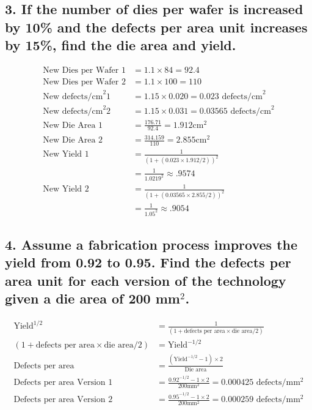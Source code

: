 \documentclass[11pt]{article}
\begin{document}
\subsection*{\small 3. If the number of dies per wafer is increased by 10\% and the defects per area unit increases by 15\%, find the die area and yield.}
\begin{align*}
\textrm{New Dies per Wafer 1} & = 1.1 \times 84 = 92.4\\
\textrm{New Dies per Wafer 2} & = 1.1 \times 100 = 110\\
\textrm{New defects/cm}^2 1 & = 1.15 \times 0.020 = 0.023 \textrm{ defects/cm}^2\\
\textrm{New defects/cm}^2 2 & = 1.15 \times 0.031 = 0.03565 \textrm{ defects/cm}^2\\
\textrm{New Die Area 1} & = \frac{176.71}{92.4} = \boldsymbol{1.912} \textrm{cm}^2\\
\textrm{New Die Area 2} & = \frac{314.159}{110} = \boldsymbol{2.855} \textrm{cm}^2\\
\textrm{New Yield 1} &= \frac{1}{{(1 + (0.023 \times 1.912/2))^2}}\\
& = \frac{1}{{1.0219}^2} \approx \boldsymbol{.9574}\\
\textrm{New Yield 2} &= \frac{1}{{(1 + (0.03565 \times 2.855/2))^2}}\\
& = \frac{1}{{1.05}^2} \approx \boldsymbol{.9054}
\end{align*}

\subsection*{\small 4. Assume a fabrication process improves the yield from 0.92 to 0.95. Find the defects per area unit for each version of the technology given a die area of 200 mm$^2$.}
\begin{align*}
\textrm{Yield}^{1/2} & = \frac{1}{(1 + \textrm{defects per area} \times \textrm{die area}/2)}\\
(1 + \textrm{defects per area} \times \textrm{die area}/2) & = \textrm{Yield}^{-1/2}\\
\textrm{Defects per area} & = \frac{(\textrm{Yield}^{-1/2}-1) \times 2}{\textrm{Die area}}\\
\textrm{Defects per area Version 1} & = \frac{0.92^{-1/2}-1 \times 2}{200 \textrm{mm}^2} = \boldsymbol{0.000425} \textrm{ defects}/\textrm{mm}^2\\
\textrm{Defects per area Version 2} & = \frac{0.95^{-1/2}-1 \times 2}{200 \textrm{mm}^2} = \boldsymbol{0.000259} \textrm{ defects}/\textrm{mm}^2
\end{align*}
\end{document}
